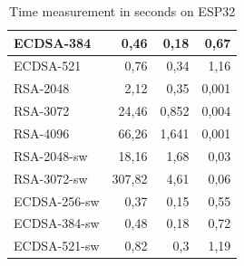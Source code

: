 \documentclass[thesis=M,english]{FITthesis}[2019/12/23]
\begin{document}
\begin{table}[]
\begin{tabular}{|l|r|r|r|}
 ECDSA-384           &  0,46                            &  0,18                         &  0,67                              \\ \hline
 ECDSA-521           &  0,76                            &  0,34                         &  1,16                              \\ \hline
 RSA-2048            &  2,12                            &  0,35                         &  0,001                             \\ \hline
 RSA-3072            &  24,46                           &  0,852                        &  0,004                             \\ \hline
 RSA-4096            &  66,26                           &  1,641                        &  0,001                             \\ \hline
 RSA-2048-sw  & 18,16  & 1,68 & 0,03 \\ \hline
RSA-3072-sw  & 307,82 & 4,61 & 0,06 \\ \hline
ECDSA-256-sw & 0,37   & 0,15 & 0,55 \\ \hline
ECDSA-384-sw & 0,48   & 0,18 & 0,72 \\ \hline
ECDSA-521-sw & 0,82   & 0,3  & 1,19 \\ \hline
\end{tabular}
\caption{Time measurement in seconds on ESP32}
\end{table}
\end{document}

